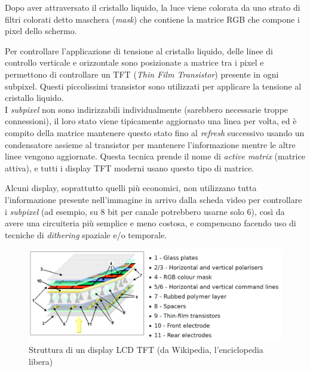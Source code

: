 Dopo aver attraversato il cristallo liquido, la luce viene colorata da uno strato di filtri colorati detto maschera (\textit{mask}) che contiene la matrice RGB che compone i pixel dello schermo.

Per controllare l'applicazione di tensione al cristallo liquido, delle linee di controllo verticale e orizzontale sono posizionate a matrice tra i pixel e permettono di controllare un TFT (\textit{Thin Film Transistor}) presente in ogni subpixel. Questi piccolissimi transistor sono utilizzati per applicare la tensione al cristallo liquido.\\
I \textit{subpixel} non sono indirizzabili individualmente (sarebbero necessarie troppe connessioni), il loro stato viene tipicamente aggiornato una linea per volta, ed è compito della matrice mantenere questo stato fino al \textit{refresh} successivo usando un condensatore assieme al transistor per mantenere l'informazione mentre le altre linee vengono aggiornate. Questa tecnica prende il nome di \textit{active matrix} (matrice attiva), e tutti i display TFT moderni usano questo tipo di matrice.

Alcuni display, soprattutto quelli più economici, non utilizzano tutta l'informazione presente nell'immagine in arrivo dalla scheda video per controllare i \textit{subpixel} (ad esempio, su 8 bit per canale potrebbero usarne solo 6), così da avere una circuiteria più semplice e meno costosa, e compensano facendo uso di tecniche di \textit{dithering} spaziale e/o temporale.

\begin{figure}[h]
	\centering
	\includegraphics[width=\textwidth]{Introduzione_files/lcdtft.png}
	\caption{Struttura di un display LCD TFT (da Wikipedia, l'enciclopedia libera)}
	\label{fig:lcdtft}
\end{figure}

